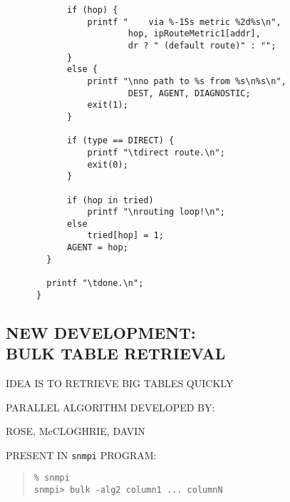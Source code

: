 \begin{bwslide}

\vspace{0.5in}
\smaller
\begin{verbatim}
            if (hop) {
                printf "    via %-15s metric %2d%s\n",
                        hop, ipRouteMetric1[addr],
                        dr ? " (default route)" : "";
            }
            else {
                printf "\nno path to %s from %s\n%s\n", 
                        DEST, AGENT, DIAGNOSTIC;
                exit(1);
            }

            if (type == DIRECT) {
                printf "\tdirect route.\n";
                exit(0);
            }

            if (hop in tried)
                printf "\nrouting loop!\n";
            else
                tried[hop] = 1;
            AGENT = hop;
        }

        printf "\tdone.\n";
      }
\end{verbatim}
\end{bwslide}


\begin{bwslide}
\part*	{NEW DEVELOPMENT:\\ BULK TABLE RETRIEVAL}\bf

\begin{nrtc}
\item	IDEA IS TO RETRIEVE BIG TABLES QUICKLY

\item	PARALLEL ALGORITHM DEVELOPED BY:
    \begin{nrtc}
    \item	ROSE, McCLOGHRIE, DAVIN
    \end{nrtc}

\item	PRESENT IN \verb"snmpi" PROGRAM:
\begin{quote}\small\begin{verbatim}
% snmpi
snmpi> bulk -alg2 column1 ... columnN
\end{verbatim}\end{quote}
\end{nrtc}
\end{bwslide}


